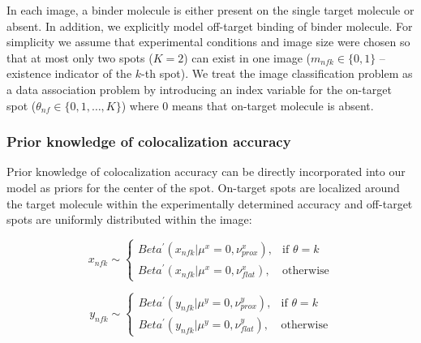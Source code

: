 In each image, a binder molecule is either present on the single target molecule or absent. In addition, we explicitly model off-target binding of binder molecule. For simplicity  we assume that experimental conditions and image size were chosen so that at most only two spots ($K=2$) can exist in one image ($m_{nfk} \in \{ 0,1 \}$ -- existence indicator of the $k$-th spot). We treat the image classification problem as a data association problem by introducing an index variable for the on-target spot ($\theta_{nf} \in \{ 0,1,\dots,K \}$) where 0 means that on-target molecule is absent.





\subsubsection{Prior knowledge of colocalization accuracy}

Prior knowledge of colocalization accuracy can be directly incorporated into our model as priors for the center of the spot. On-target spots are localized around the target molecule within the experimentally determined accuracy and off-target spots are uniformly distributed within the image:

\begin{equation*}
    x_{nfk} \sim
\begin{cases}
    Beta^{\prime}(x_{nfk}|\mu^x=0,\nu^x_{prox}),& \text{if } \theta = k\\
    Beta^{\prime}(x_{nfk}|\mu^x=0,\nu^x_{flat}),& \text{otherwise}
\end{cases}
\end{equation*}

\begin{equation*}
    y_{nfk} \sim
\begin{cases}
    Beta^{\prime}(y_{nfk}|\mu^y=0,\nu^y_{prox}),& \text{if } \theta = k\\
    Beta^{\prime}(y_{nfk}|\mu^y=0,\nu^y_{flat}),& \text{otherwise}
\end{cases}
\end{equation*}





